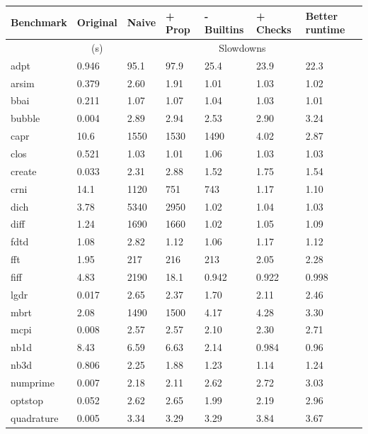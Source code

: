 \begin{table}
\begin{tabular}{| l || l || l | l | l | l | l |}
  \hline
  Benchmark & Original & Naive & + Prop & - Builtins & + Checks & Better runtime \\ \hline
            & \multicolumn{1}{c||}{(s)} & \multicolumn{5}{c|}{Slowdowns} \\ \hhline{|=||=||=|=|=|=|=|}
  adpt        & 0.946 & 95.1 & 97.9 & 25.4 & 23.9 & 22.3  \\ \hline
  arsim       & 0.379 & 2.60 & 1.91 & 1.01 & 1.03 & 1.02  \\ \hline
  bbai        & 0.211 & 1.07 & 1.07 & 1.04 & 1.03 & 1.01  \\ \hline
  bubble      & 0.004 & 2.89 & 2.94 & 2.53 & 2.90 & 3.24  \\ \hline
  capr        & 10.6  & 1550 & 1530 & 1490 & 4.02 & 2.87  \\ \hline
  clos        & 0.521 & 1.03 & 1.01 & 1.06 & 1.03 & 1.03  \\ \hline
  create      & 0.033 & 2.31 & 2.88 & 1.52 & 1.75 & 1.54  \\ \hline
  crni        & 14.1  & 1120 & 751  & 743  & 1.17 & 1.10  \\ \hline
  dich        & 3.78  & 5340 & 2950 & 1.02 & 1.04 & 1.03  \\ \hline
  diff        & 1.24  & 1690 & 1660 & 1.02 & 1.05 & 1.09  \\ \hline
  fdtd        & 1.08  & 2.82 & 1.12 & 1.06 & 1.17 & 1.12  \\ \hline
  fft         & 1.95  & 217  & 216  & 213  & 2.05 & 2.28  \\ \hline
  fiff        & 4.83  & 2190 & 18.1 & 0.942& 0.922& 0.998 \\ \hline
  lgdr        & 0.017 & 2.65 & 2.37 & 1.70 & 2.11 & 2.46  \\ \hline
  mbrt        & 2.08  & 1490 & 1500 & 4.17 & 4.28 & 3.30  \\ \hline
  mcpi        & 0.008 & 2.57 & 2.57 & 2.10 & 2.30 & 2.71  \\ \hline
  nb1d        & 8.43  & 6.59 & 6.63 & 2.14 & 0.984& 0.96  \\ \hline
  nb3d        & 0.806 & 2.25 & 1.88 & 1.23 & 1.14 & 1.24  \\ \hline
  numprime    & 0.007 & 2.18 & 2.11 & 2.62 & 2.72 & 3.03  \\ \hline
  optstop     & 0.052 & 2.62 & 2.65 & 1.99 & 2.19 & 2.96 \\ \hline
  quadrature  & 0.005 & 3.34 & 3.29 & 3.29 & 3.84 & 3.67  \\ \hline

\end{tabular}
\end{table}
